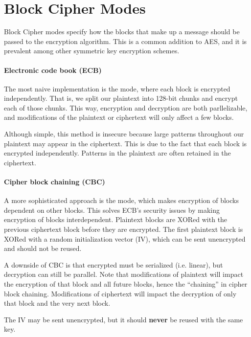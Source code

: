 \section{Block Cipher Modes}

Block Cipher modes specify how the blocks that make up a message should be passed to the encryption algorithm. This is a common addition to AES, and it is prevalent among other symmetric key encryption schemes.

\paragraph{Electronic code book (ECB)}
The most naive implementation is the  mode, where each block is encrypted independently. That is, we split our plaintext into 128-bit chunks and encrypt each of those chunks. This way, encryption and decryption are both parllelizable, and modifications of the plaintext or ciphertext will only affect a few blocks.

Although simple, this method is insecure because large patterns throughout our plaintext may appear in the ciphertext. This is due to the fact that each block is encrypted independently. Patterns in the plaintext are often retained in the ciphertext.

\paragraph{Cipher block chaining (CBC)}
A more sophisticated approach is the  mode, which makes encryption of blocks dependent on other blocks. This solves ECB's security issues by making encryption of blocks interdependent. Plaintext blocks are XORed with the previous ciphertext block before they are encrypted. The first plaintext block is XORed with a random initialization vector (IV), which can be sent unencrypted and should not be reused.

A downside of CBC is that encrypted must be serialized (i.e. linear), but decryption can still be parallel. Note that modifications of plaintext will impact the encryption of that block and all future blocks, hence the ``chaining'' in cipher block chaining. Modifications of ciphertext will impact the decryption of only that block and the very next block.

\begin{notebox}
    The IV may be sent unencrypted, but it should \textbf{never} be reused with the same key.
\end{notebox}


